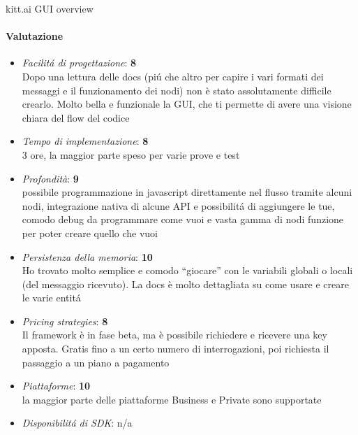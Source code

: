 \documentclass[]{article}
\begin{document}
\begin{center}
\footnotesize{kitt.ai GUI overview}
\end{center}

\paragraph{Valutazione} 
\begin{itemize}
\item \textit{Facilitá di progettazione}: \textbf{8} \\ Dopo una lettura delle docs (piú che altro per capire i vari formati dei messaggi e il funzionamento dei nodi) non è stato assolutamente difficile crearlo. Molto bella e funzionale la GUI, che ti permette di avere una visione chiara del flow del codice
\item \textit{Tempo di implementazione}: \textbf{8} \\ 3 ore, la maggior parte speso per varie prove e test
\item \textit{Profondità}: \textbf{9} \\ possibile programmazione in javascript direttamente nel flusso tramite alcuni nodi, integrazione nativa di alcune API e possibilitá di aggiungere le tue, comodo debug da programmare come vuoi e vasta gamma di nodi funzione per poter creare quello che vuoi
\item \textit{Persistenza della memoria}: \textbf{10} \\ Ho trovato molto semplice e comodo “giocare” con le variabili globali o locali (del messaggio ricevuto). La docs è molto dettagliata su come usare e creare le varie entitá
\item \textit{Pricing strategies}: \textbf{8} \\ Il framework è in fase beta, ma è possibile richiedere e ricevere una key apposta. Gratis fino a un certo numero di interrogazioni, poi richiesta il passaggio a un piano a pagamento
\item \textit{Piattaforme}: \textbf{10} \\  la maggior parte delle piattaforme Business e Private sono supportate
\item \textit{Disponibilitá di SDK}: n/a
\end{itemize}
\end{document}
